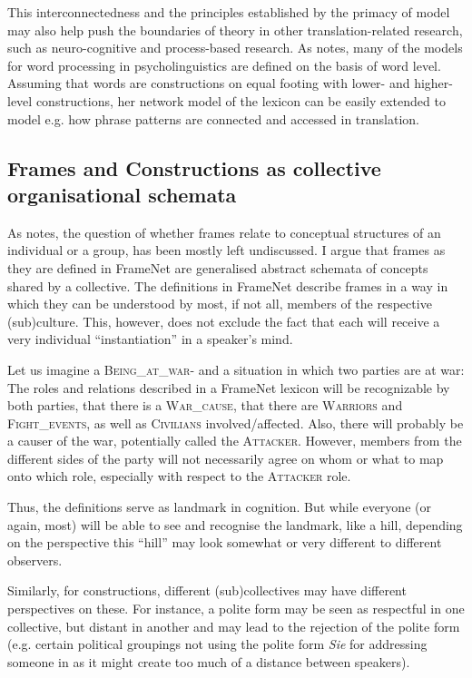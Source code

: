 \documentclass[output=paper]{LSP/langsci}
\begin{document}
This interconnectedness and the principles established by the primacy of  model may also help push the boundaries of theory in other translation-related research, such as neuro-cognitive and process-based research. As  notes, many of the models for word processing in psycholinguistics are defined on the basis of word level. Assuming that words are constructions on equal footing with lower- and higher-level constructions, her network model of the lexicon can be easily extended to model e.g. how phrase patterns are connected and accessed in translation.

\subsection{Frames and Constructions as collective organisational schemata}\label{czulo:sec:3.3}

As \citet{Busse2012} notes, the question of whether frames relate to conceptual structures of an individual or a group, has been mostly left undiscussed. I argue that frames as they are defined in FrameNet are generalised abstract schemata of concepts shared by a collective. The definitions in FrameNet describe frames in a way in which they can be understood by most, if not all, members of the respective (sub)culture. This, however, does not exclude the fact that each  will receive a very individual ``instantiation'' in a speaker's mind.

Let us imagine a \textsc{Being\_at\_war{}}- and a situation in which two parties are at war: The roles and relations described in a FrameNet lexicon will be recognizable by both parties, that there is a \textsc{War\_cause}, that there are \textsc{Warriors} and \textsc{Fight\_events}, as well as  \textsc{Civilians} involved/affected. Also, there will probably be a causer of the war, potentially called the \textsc{Attacker}. However, members from the different sides of the party will not necessarily agree on whom or what to map onto which role, especially with respect to the \textsc{Attacker} role. 

Thus, the  definitions serve as landmark in cognition. But while everyone (or again, most) will be able to see and recognise the landmark, like a hill, depending on the perspective this ``hill'' may look somewhat or very different to different observers. 

Similarly, for constructions, different (sub)collectives may have different perspectives on these. For instance, a polite form may be seen as respectful in one collective, but distant in another and may lead to the rejection of the polite form (e.g. certain political groupings not using the polite form \textit{Sie} for addressing someone in  as it might create too much of a distance between speakers).
\end{document}
